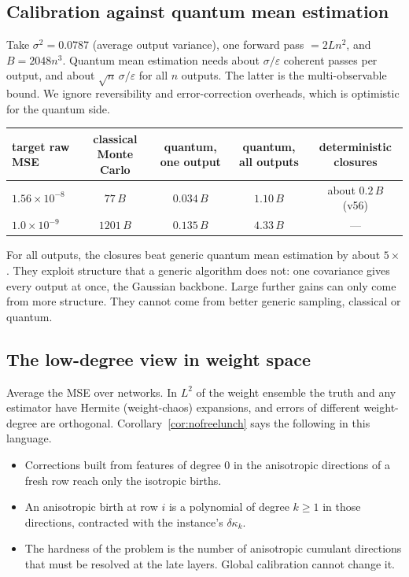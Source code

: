 \subsection{Calibration against quantum mean estimation}
Take $\sigma^2=0.0787$ (average output variance), one forward pass $=2Ln^2$, and $B=2048n^3$. Quantum mean estimation needs about
$\sigma/\varepsilon$ coherent passes per output, and about $\sqrt n\,\sigma/\varepsilon$ for all $n$ outputs. The latter is the multi-observable
bound. We ignore reversibility and error-correction overheads, which is optimistic for the quantum side.
\begin{center}\footnotesize\setlength{\tabcolsep}{4pt}
\begin{tabular}{lcccc}\toprule
target raw MSE & classical Monte Carlo & quantum, one output & quantum, all outputs & deterministic closures\\\midrule
$1.56\times10^{-8}$ & $77\,B$ & $0.034\,B$ & $1.10\,B$ & about $0.2\,B$ (v56)\\
$1.0\times10^{-9}$ & $1201\,B$ & $0.135\,B$ & $4.33\,B$ & ---\\\bottomrule
\end{tabular}
\end{center}
For all outputs, the closures beat generic quantum mean estimation by about $5\times$. They exploit structure that a generic algorithm does
not: one covariance gives every output at once, the Gaussian backbone. Large further gains can only come from more structure. They
cannot come from better generic sampling, classical or quantum.

\subsection{The low-degree view in weight space}
Average the MSE over networks. In $L^2$ of the weight ensemble the truth and any estimator have Hermite (weight-chaos) expansions, and
errors of different weight-degree are orthogonal. Corollary~\ref{cor:nofreelunch} says the following in this language.
\begin{itemize}[leftmargin=*]
\item Corrections built from features of degree $0$ in the anisotropic directions of a fresh row reach only the isotropic births.
\item An anisotropic birth at row $i$ is a polynomial of degree $k\ge1$ in those directions, contracted with the instance's
$\delta\kappa_k$.
\item The hardness of the problem is the number of anisotropic cumulant directions that must be resolved at the late layers. Global
calibration cannot change it.
\end{itemize}


